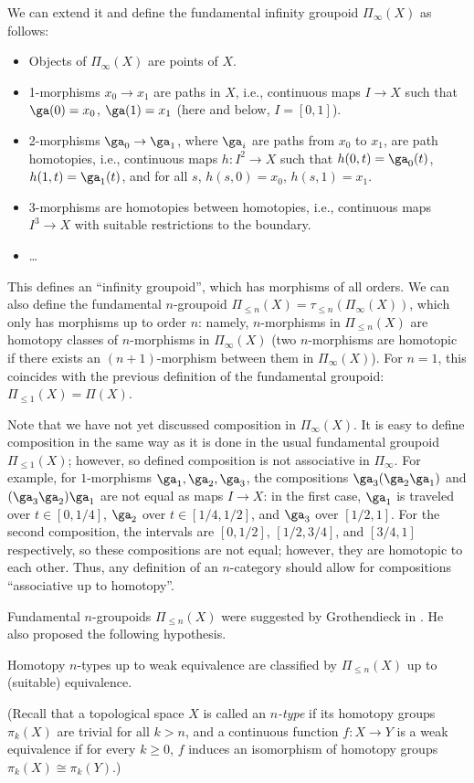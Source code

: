 We can extend it and define the fundamental infinity groupoid $\Pi_{\infty}(X)$
as follows:
\begin{itemize}
  \item Objects of $\Pi_{\infty}(X)$ are points of $X$.
  \item 1-morphisms $x_0\to x_1$ are paths in $X$, i.e., continuous maps
    $I\to X$ such that $\ga(0)=x_0$, $\ga(1)=x_1$ (here and below, $I=[0,1]$).
  \item 2-morphisms $\ga_0\to \ga_1$, where $\ga_i$ are paths from $x_0$ to
  $x_1$, are path homotopies, i.e., continuous maps $h\colon I^2\to X$ such that
  $h(0,t)=\ga_0(t)$, $h(1, t)=\ga_1(t)$, and for all $s$, $h(s,0)=x_0$,
  $h(s,1)=x_1$.
  \item 3-morphisms are homotopies between homotopies, i.e., continuous maps
  $I^3\to X$ with suitable restrictions to the boundary.
  \item \dots
\end{itemize}
This defines an ``infinity groupoid'', which has morphisms of all orders. We can
also define the fundamental $n$-groupoid $\Pi_{\leq n}(X)=\tau_{\leq
n}(\Pi_\infty(X))$, which only has morphisms up to order $n$: namely,
$n$-morphisms in $\Pi_{\leq n}(X)$ are homotopy classes of
$n$-morphisms in $\Pi_{\infty}(X)$ (two $n$-morphisms are homotopic if there
exists an $(n+1)$-morphism between them in $\Pi_\infty(X)$). For $n=1$, this
coincides with the previous definition of the fundamental groupoid:
$\Pi_{\le 1}(X)=\Pi(X)$.

Note that we have not yet discussed composition in $\Pi_\infty(X)$. It is easy
to define composition in the same way as it is done in the usual fundamental
groupoid $\Pi_{\le 1}(X)$; however, so defined composition is not associative in
$\Pi_\infty$. For example, for $1$-morphisms $\ga_1, \ga_2, \ga_3$, the
compositions $\ga_3 (\ga_2 \ga_1)$ and $(\ga_3 \ga_2)\ga_1$ are not equal as
maps $I\to X$: in the first case, $\ga_1$ is traveled over $t\in [0, 1/4]$,
$\ga_2$ over $t\in [1/4, 1/2]$, and $\ga_3$ over $[1/2,1]$. For the second
composition, the intervals are $[0, 1/2]$, $[1/2, 3/4]$, and $[3/4,1]$
respectively, so these compositions are not equal; however, they are homotopic
to each other. Thus, any definition of an $n$-category should allow for
compositions ``associative up to homotopy''.

Fundamental $n$-groupoids $\Pi_{\leq n}(X)$ were suggested by Grothendieck in
. He also proposed the following hypothesis.
\begin{conjecture}
  Homotopy $n$-types up to weak equivalence
  are classified by $\Pi_{\leq n}(X)$ up to (suitable) equivalence.
\end{conjecture}
(Recall that a topological space $X$ is called an \emph{$n$-type} if its
homotopy groups $\pi_k(X)$ are trivial for all $k>n$, and a continuous function
$f\colon X\to Y$ is a weak equivalence if for every $k\ge 0$, $f$ induces an
isomorphism of homotopy groups $\pi_k(X)\cong \pi_k(Y)$.)

